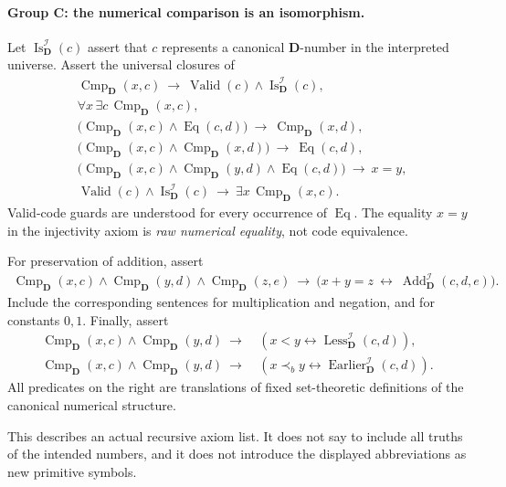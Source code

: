 \documentclass[11pt,letterpaper]{article}
\theoremstyle{definition}
\theoremstyle{remark}
\newcommand{\I}{\mathcal I}
\newcommand{\precb}{\prec_b}
\newcommand{\Valid}{\operatorname{Valid}}
\newcommand{\Eqc}{\operatorname{Eq}}
\newcommand{\Cmp}{\operatorname{Cmp}}
\newcommand{\Dd}{\mathbf{D}}
\begin{document}
\paragraph{Group C: the numerical comparison is an isomorphism.} Let
$\operatorname{Is}_{\Dd}^{\I}(c)$ assert that $c$ represents a canonical
$\Dd$-number in the interpreted universe. Assert the universal closures of
\begin{align*}
 &\Cmp_{\Dd}(x,c)\ \longrightarrow\ \Valid(c)\land \operatorname{Is}_{\Dd}^{\I}(c),\\
 &\forall x\,\exists c\,\Cmp_{\Dd}(x,c),\\
 &\bigl(\Cmp_{\Dd}(x,c)\land\Eqc(c,d)\bigr)\ \longrightarrow\ \Cmp_{\Dd}(x,d),\\
 &\bigl(\Cmp_{\Dd}(x,c)\land \Cmp_{\Dd}(x,d)\bigr)\ \longrightarrow\ \Eqc(c,d),\\
 &\bigl(\Cmp_{\Dd}(x,c)\land \Cmp_{\Dd}(y,d)\land\Eqc(c,d)\bigr)\ \longrightarrow\ x=y,\\
 &\Valid(c)\land \operatorname{Is}_{\Dd}^{\I}(c)\ \longrightarrow\ \exists x\,\Cmp_{\Dd}(x,c).
\end{align*}
Valid-code guards are understood for every occurrence of $\Eqc$. The equality
$x=y$ in the injectivity axiom is \emph{raw numerical equality}, not code
equivalence.

For preservation of addition, assert
\[
\begin{split}
 \Cmp_{\Dd}(x,c)\land \Cmp_{\Dd}(y,d)\land \Cmp_{\Dd}(z,e)\ \longrightarrow\
 \bigl(x+y=z\ \longleftrightarrow\ \operatorname{Add}_{\Dd}^{\I}(c,d,e)\bigr).
\end{split}
\]
Include the corresponding sentences for multiplication and negation, and for
constants $0,1$. Finally, assert
\[
\begin{split}
 \Cmp_{\Dd}(x,c)\land \Cmp_{\Dd}(y,d)\ \longrightarrow\
 &(x<y\longleftrightarrow\operatorname{Less}_{\Dd}^{\I}(c,d)),\\
 \Cmp_{\Dd}(x,c)\land \Cmp_{\Dd}(y,d)\ \longrightarrow\
 &(x\precb y\longleftrightarrow\operatorname{Earlier}_{\Dd}^{\I}(c,d)).
\end{split}
\]
All predicates on the right are translations of fixed set-theoretic definitions of
the canonical numerical structure.

This describes an actual recursive axiom list. It does not say to include all
truths of the intended numbers, and it does not introduce the displayed
abbreviations as new primitive symbols.
\end{document}

